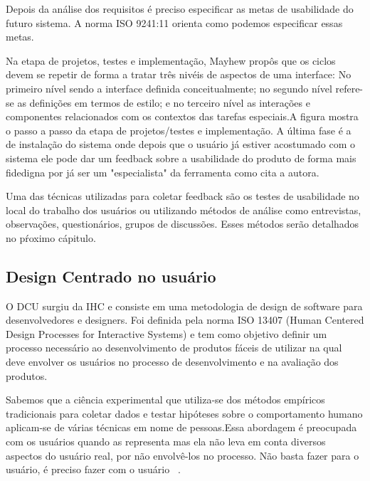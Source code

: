 
	Depois da análise dos requisitos é preciso especificar as metas de usabilidade do futuro sistema. A norma ISO 9241:11 orienta como podemos especificar essas metas.


	Na etapa de projetos, testes e implementação, Mayhew propôs que os ciclos devem se repetir de forma a tratar três nivéis de aspectos de uma interface: No primeiro nível sendo a interface definida conceitualmente; no segundo nível refere-se as definições em termos de estilo; e no terceiro nível as interações e componentes relacionados com os contextos das tarefas especiais.A figura mostra o passo a passo da etapa de projetos/testes e implementação.
	A última fase é a de instalação do sistema onde depois que o usuário já estiver acostumado com o sistema ele pode dar um feedback sobre a usabilidade do produto de forma mais fidedigna por já ser um "especialista" da ferramenta como cita a autora. 


	Uma das técnicas utilizadas para coletar feedback são os testes de usabilidade no local do trabalho dos usuários ou utilizando métodos de análise como entrevistas, observações, questionários, grupos de discussões. Esses métodos serão detalhados no pŕoximo cápitulo.


\subsection{Design Centrado no usuário}

O DCU surgiu da IHC e consiste em uma metodologia de design de software para desenvolvedores e designers. Foi definida pela norma ISO 13407 (Human Centered Design Processes for Interactive Systems) e tem como objetivo definir um processo necessário ao desenvolvimento de produtos fáceis de utilizar na qual deve envolver os usuários no processo de desenvolvimento e na avaliação dos produtos.

Sabemos que a ciência experimental que utiliza-se dos métodos empíricos tradicionais para coletar dados e testar hipóteses sobre o comportamento humano aplicam-se de várias técnicas em nome de pessoas.Essa abordagem é preocupada com os usuários quando as representa mas ela não leva em conta diversos aspectos do usuário real, por não envolvê-los no processo. Não basta fazer para o usuário, é preciso fazer com o usuário ~\cite{eason1995}. 

